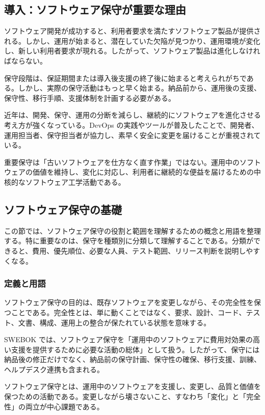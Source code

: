 \documentclass[a4paper,11pt]{ltjsarticle}
\numberwithin{figure}{section}
\numberwithin{table}{section}
\newcounter{definition}
\begin{document}
\subsection{導入：ソフトウェア保守が重要な理由}
ソフトウェア開発が成功すると、利用者要求を満たすソフトウェア製品が提供される。しかし、運用が始まると、潜在していた欠陥が見つかり、運用環境が変化し、新しい利用者要求が現れる。したがって、ソフトウェア製品は進化しなければならない。\par
保守段階は、保証期間または導入後支援の終了後に始まると考えられがちである。しかし、実際の保守活動はもっと早く始まる。納品前から、運用後の支援、保守性、移行手順、支援体制を計画する必要がある。\par
近年は、開発、保守、運用の分断を減らし、継続的にソフトウェアを進化させる考え方が強くなっている。DevOps の実践やツールが普及したことで、開発者、運用担当者、保守担当者が協力し、素早く安全に変更を届けることが重視されている。\par
\begin{pointbox}{重要}保守は「古いソフトウェアを仕方なく直す作業」ではない。運用中のソフトウェアの価値を維持し、変化に対応し、利用者に継続的な便益を届けるための中核的なソフトウェア工学活動である。\end{pointbox}
\subsection{ソフトウェア保守の基礎}
この節では、ソフトウェア保守の役割と範囲を理解するための概念と用語を整理する。特に重要なのは、保守を種類別に分類して理解することである。分類ができると、費用、優先順位、必要な人員、テスト範囲、リリース判断を説明しやすくなる。\par
\subsubsection{定義と用語}
ソフトウェア保守の目的は、既存ソフトウェアを変更しながら、その完全性を保つことである。完全性とは、単に動くことではなく、要求、設計、コード、テスト、文書、構成、運用上の整合が保たれている状態を意味する。\par
SWEBOK では、ソフトウェア保守を「運用中のソフトウェアに費用対効果の高い支援を提供するために必要な活動の総体」として扱う。したがって、保守には納品後の修正だけでなく、納品前の保守計画、保守性の確保、移行支援、訓練、ヘルプデスク連携も含まれる。\par
\begin{definitionbox}ソフトウェア保守とは、運用中のソフトウェアを支援し、変更し、品質と価値を保つための活動である。変更しながら壊さないこと、すなわち「変化」と「完全性」の両立が中心課題である。\end{definitionbox}
\end{document}
